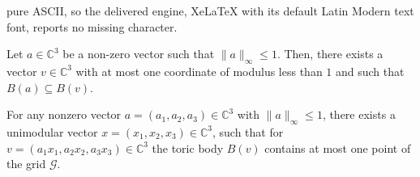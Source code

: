 \documentclass[10pt,a4paper]{amsart}
\begin{document}
pure ASCII, so the delivered engine, XeLaTeX with its default Latin Modern text font, reports no missing character.
\begin{lemma}\label{lem:blob_expansion}
Let $a \in \mathbb{C}^3$ be a non-zero vector such that $\|a\|_{\infty} \leq 1$. Then, there exists a vector $v \in \mathbb{C}^3$ with at most one coordinate of modulus less than $1$ and such that $B(a) \subseteq B(v)$.
\end{lemma}

\begin{lemma} \label{lem:grid_placement}
For any nonzero vector $a=(a_1, a_2, a_3) \in \mathbb{C}^3$ with $\|a\|_{\infty} \leq 1$, there exists a unimodular vector $x=(x_1, x_2, x_3) \in \mathbb{C}^3$, such that for $v=(a_1x_1, a_2x_2, a_3x_3) \in \mathbb{C}^3$ the toric body $B(v)$ contains at most one point of the grid $\mathcal{G}$.
\end{lemma}
\end{document}
